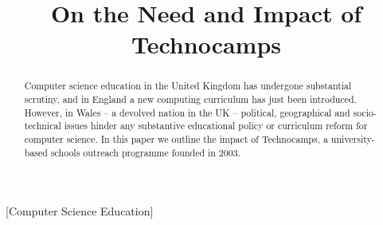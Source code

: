 \documentclass{sig-alternate}
\begin{document}
%



\title{On the Need and Impact of Technocamps}


\maketitle

\begin{abstract}
Computer science education in the United Kingdom has
undergone substantial scrutiny,
and in England a new computing curriculum has just been introduced.
However, in Wales --
a devolved nation in the UK -- political,
geographical and socio-technical issues hinder any substantive
educational policy or curriculum reform for computer science.
In this paper we outline
the impact of Technocamps,
a university-based schools outreach programme founded in 2003.
\end{abstract}

[Computer Science Education]
\end{document}
